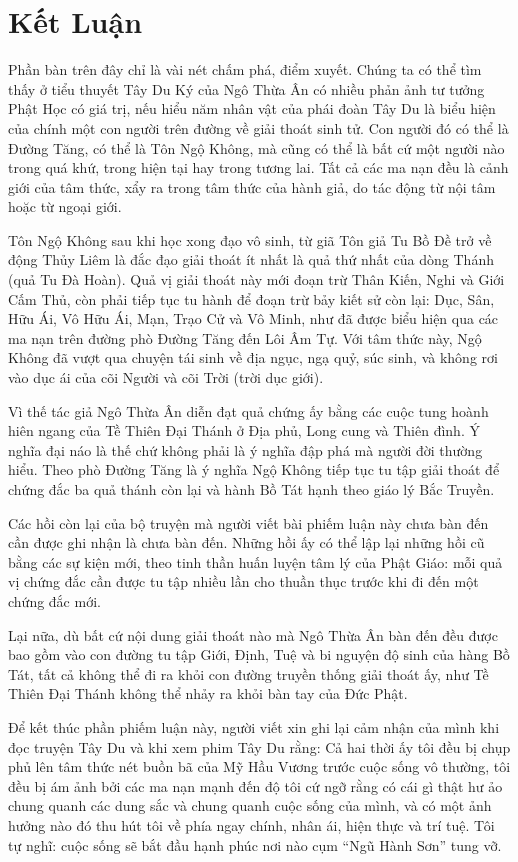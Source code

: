 \chapter{Kết Luận} %
\label{cha:ket_luan}

Phần bàn trên đây chỉ là vài nét chấm phá, điểm xuyết. Chúng ta có thể tìm thấy ở tiểu thuyết Tây Du Ký của Ngô Thừa Ân có nhiều phản ảnh tư tưởng Phật Học có giá trị, nếu hiểu năm nhân vật của phái đoàn Tây Du là biểu hiện của chính một con người trên đường về giải thoát sinh tử. Con người đó có thể là Đường Tăng, có thể là Tôn Ngộ Không, mà cũng có thể là bất cứ một người nào trong quá khứ, trong hiện tại hay trong tương lai. Tất cả các ma nạn đều là cảnh giới của tâm thức, xẩy ra trong tâm thức của hành giả, do tác động từ nội tâm hoặc từ ngoại giới.

Tôn Ngộ Không sau khi học xong đạo vô sinh, từ giã Tôn giả Tu Bồ Đề trở về động Thủy Liêm là đắc đạo giải thoát ít nhất là quả thứ nhất của dòng Thánh (quả Tu Đà Hoàn). Quả vị giải thoát này mới đoạn trừ Thân Kiến, Nghi và Giới Cấm Thủ, còn phải tiếp tục tu hành để đoạn trừ bảy kiết sử còn lại: Dục, Sân, Hữu Ái, Vô Hữu Ái, Mạn, Trạo Cử và Vô Minh, như đã được biểu hiện qua các ma nạn trên đường phò Đường Tăng đến Lôi Âm Tự. Với tâm thức này, Ngộ Không đã vượt qua chuyện tái sinh về địa ngục, ngạ quỷ, súc sinh, và không rơi vào dục ái của cõi Người và cõi Trời (trời dục giới).

Vì thế tác giả Ngô Thừa Ân diễn đạt quả chứng ấy bằng các cuộc tung hoành hiên ngang của Tề Thiên Đại Thánh ở Địa phủ, Long cung và Thiên đình. Ý nghĩa đại náo là thế chứ không phải là ý nghĩa đập phá mà người đời thường hiểu. Theo phò Đường Tăng là ý nghĩa Ngộ Không tiếp tục tu tập giải thoát để chứng đắc ba quả thánh còn lại và hành Bồ Tát hạnh theo giáo lý Bắc Truyền.

Các hồi còn lại của bộ truyện mà người viết bài phiếm luận này chưa bàn đến cần được ghi nhận là chưa bàn đến. Những hồi ấy có thể lập lại những hồi cũ bằng các sự kiện mới, theo tinh thần huấn luyện tâm lý của Phật Giáo: mỗi quả vị chứng đắc cần được tu tập nhiều lần cho thuần thục trước khi đi đến một chứng đắc mới.

Lại nữa, dù bất cứ nội dung giải thoát nào mà Ngô Thừa Ân bàn đến đều được bao gồm vào con đường tu tập Giới, Định, Tuệ và bi nguyện độ sinh của hàng Bồ Tát, tất cả không thể đi ra khỏi con đường truyền thống giải thoát ấy, như Tề Thiên Đại Thánh không thể nhảy ra khỏi bàn tay của Đức Phật.

Để kết thúc phần phiếm luận này, người viết xin ghi lại cảm nhận của mình khi đọc truyện Tây Du và khi xem phim Tây Du rằng: Cả hai thời ấy tôi đều bị chụp phủ lên tâm thức nét buồn bã của Mỹ Hầu Vương trước cuộc sống vô thường, tôi đều bị ám ảnh bởi các ma nạn mạnh đến độ tôi cứ ngỡ rằng có cái gì thật hư ảo chung quanh các dung sắc và chung quanh cuộc sống của mình, và có một ảnh hưởng nào đó thu hút tôi về phía ngay chính, nhân ái, hiện thực và trí tuệ. Tôi tự nghĩ: cuộc sống sẽ bắt đầu hạnh phúc nơi nào cụm ``Ngũ Hành Sơn'' tung vỡ.

\afterpage{\blankpage}
\addtocounter{page}{+1}